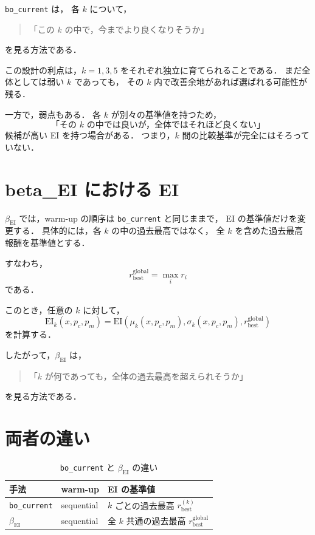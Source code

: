 \documentclass[a4paper,11pt]{ltjsarticle}
\newcommand{\EI}{\mathrm{EI}}
\begin{document}
\texttt{bo\_current} は，
各 \(k\) について，
\begin{quote}
  「この \(k\) の中で，今までより良くなりそうか」
\end{quote}
を見る方法である．

この設計の利点は，\(k=1,3,5\) をそれぞれ独立に育てられることである．
まだ全体としては弱い \(k\) であっても，
その \(k\) 内で改善余地があれば選ばれる可能性が残る．

一方で，弱点もある．
各 \(k\) が別々の基準値を持つため，
\[
  \text{「その \(k\) の中では良いが，全体ではそれほど良くない」}
\]
候補が高い EI を持つ場合がある．
つまり，\(k\) 間の比較基準が完全にはそろっていない．

\section{beta\_EI における EI}

\(\beta_{\mathrm{EI}}\) では，warm-up の順序は \texttt{bo\_current} と同じままで，
EI の基準値だけを変更する．
具体的には，各 \(k\) の中の過去最高ではなく，
全 \(k\) を含めた過去最高報酬を基準値とする．

すなわち，
\[
  r_{\mathrm{best}}^{\mathrm{global}}
  =
  \max_i r_i
\]
である．

このとき，任意の \(k\) に対して，
\[
  \EI_k(x,p_c,p_m)
  =
  \EI
  \left(
  \mu_k(x,p_c,p_m),
  \sigma_k(x,p_c,p_m),
  r_{\mathrm{best}}^{\mathrm{global}}
  \right)
\]
を計算する．

したがって，\(\beta_{\mathrm{EI}}\) は，
\begin{quote}
  「\(k\) が何であっても，全体の過去最高を超えられそうか」
\end{quote}
を見る方法である．

\section{両者の違い}

\begin{table}[htbp]
\centering
\caption{\texttt{bo\_current} と \(\beta_{\mathrm{EI}}\) の違い}
\begin{tabular}{lll}
\toprule
手法 & warm-up & EI の基準値 \\
\midrule
\texttt{bo\_current} & sequential & \(k\) ごとの過去最高 \(r_{\mathrm{best}}^{(k)}\) \\
\(\beta_{\mathrm{EI}}\) & sequential & 全 \(k\) 共通の過去最高 \(r_{\mathrm{best}}^{\mathrm{global}}\) \\
\bottomrule
\end{tabular}
\end{table}
\end{document}
